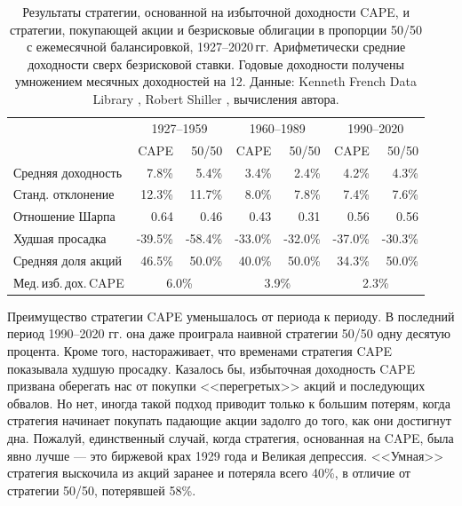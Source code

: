 \begin{table}[h!]
\centering
\begin{tabular}{l|r|r|r|r|r|r}
& \multicolumn{2}{c|}{1927--1959} & \multicolumn{2}{c|}{1960--1989} & \multicolumn{2}{c}{1990--2020} \\ 
\cline{2-7}
                   & CAPE    & 50/50 & CAPE    & 50/50 & CAPE    & 50/50 \\   \hline
Средняя доходность &  7.8\% &   5.4\%  &   3.4\% &   2.4\%   &   4.2\% &   4.3\%   \\
Станд. отклонение  &  12.3\% &   11.7\%  &  8.0\% &  7.8\%   &  7.4\% &  7.6\%   \\
Отношение Шарпа    &   0.64  &   0.46    &   0.43  &   0.31    &   0.56  &   0.56    \\
Худшая просадка    & -39.5\% & -58.4\%   & -33.0\% & -32.0\%   & -37.0\% & -30.3\% \\
Средняя доля акций &  46.5\% & 50.0\%   &  40.0\% & 50.0\%   &  34.3\% & 50.0\%  \\ 
\cline{2-7}
Мед.\,изб.\,дох.\,CAPE & \multicolumn{2}{c|}{6.0\%} & \multicolumn{2}{c|}{3.9\%} & \multicolumn{2}{c}{2.3\%} 
\end{tabular}
\caption{Результаты стратегии, основанной на избыточной доходности CAPE, и 
стратегии, покупающей акции и безрисковые облигации в пропорции 50/50 с 
ежемесячной балансировкой, 1927--2020\,гг.
Арифметически средние доходности сверх безрисковой ставки.
Годовые доходности получены умножением месячных доходностей на 12.
Данные: Kenneth French Data Library 
\cite{kennethFrench}, Robert Shiller \cite{shillerOnline}, вычисления автора.}
\label{cape_strategy_three_periods_table}
\end{table}

Преимущество стратегии CAPE уменьшалось от периода к периоду. В последний 
период 1990--2020 гг. она даже проиграла наивной стратегии 50/50 одну десятую 
процента. Кроме того, настораживает, что временами стратегия CAPE показывала
худшую просадку. Казалось бы, избыточная доходность CAPE призвана оберегать 
нас от покупки <<перегретых>> акций и последующих обвалов. Но нет, иногда 
такой подход приводит только к большим потерям, когда стратегия начинает 
покупать падающие акции задолго до того, как они достигнут дна. Пожалуй, 
единственный случай, когда стратегия, основанная на CAPE, была явно лучше --- 
это биржевой крах 1929 года и Великая депрессия. <<Умная>> стратегия выскочила 
из акций заранее и потеряла всего 40\%, в отличие от стратегии 50/50, 
потерявшей 58\%.

